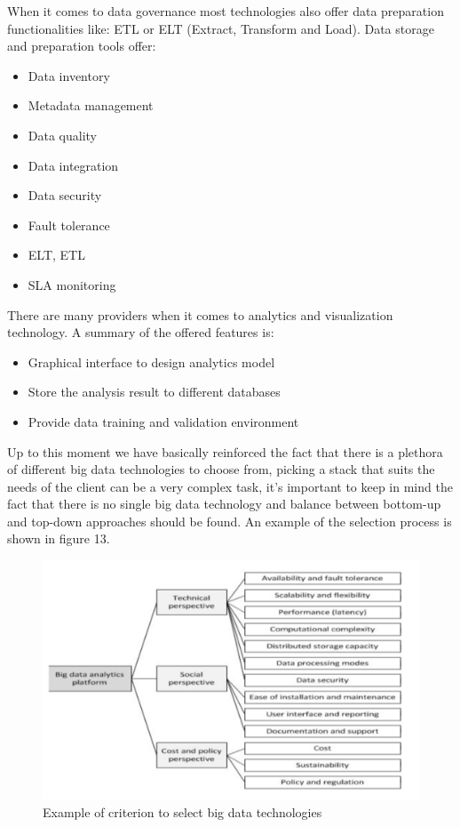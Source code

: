 When it comes to data governance most technologies also offer data preparation functionalities like: ETL or ELT (Extract, Transform and Load). \n
Data storage and preparation tools offer:
\begin{itemize}
    \item Data inventory
    \item Metadata management
    \item Data quality
    \item Data integration
    \item Data security
    \item Fault tolerance
    \item ELT, ETL
    \item SLA monitoring
\end{itemize}
There are many providers when it comes to analytics and visualization technology. A summary of the offered features is:
\begin{itemize}
    \item Graphical interface to design analytics model
    \item Store the analysis result to different databases
    \item Provide data training and validation environment
\end{itemize}
Up to this moment we have basically reinforced the fact that there is a plethora of different big data technologies to choose from, picking a stack that suits the needs of the client can be a very complex task, it's important to keep in mind the fact that there is no single big data technology and balance between bottom-up and top-down approaches should be found. An example of the selection process is shown in figure 13.
\begin{figure}
    \centering
    \includegraphics[scale=0.2]{Images/tech_selection_process.jpeg}
    \caption{Example of criterion to select big data technologies}
\end{figure}
